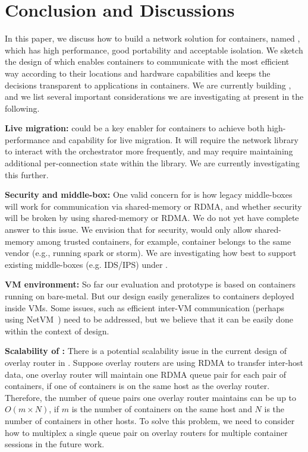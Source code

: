 \section{Conclusion and Discussions} \label{sec:discussion}

In this paper, we discuss how to build a network solution for containers, named \sysname, 
which has high performance, good portability and acceptable isolation. We sketch
the design of \sysname which enables containers to communicate with the most efficient
way according to their locations and hardware capabilities and keeps the decisions
transparent to applications in containers. We are currently building \sysname, and
we list several important considerations we are investigating at present in the following.

\textbf{Live migration:} 
\sysname could be a key enabler
for containers to achieve both high-performance and capability for live
migration. It will require the network library to interact with the orchestrator
more frequently, and may require maintaining additional per-connection state
within the library. We are currently investigating this further.

\textbf{Security and middle-box:} One valid concern for \sysname is how legacy
middle-boxes will work for communication via shared-memory or RDMA, and whether
security will be broken by using shared-memory or RDMA.  We do not yet have
complete answer to this issue. We envision that for security, \sysname would
only allow shared-memory among trusted containers, for example, container
belongs to the same vendor (e.g., running spark or storm).  We are investigating
how best to support existing middle-boxes (e.g. IDS/IPS) under \sysname.


\textbf{VM environment:}
So far our evaluation and prototype is based on containers running on
bare-metal.  But our design easily generalizes to containers deployed inside
VMs. Some issues, such as efficient inter-VM communication (perhaps using
NetVM~\cite{netvm}) need to be addressed, but we believe that it can be easily
done within the context of \sysname design.


\textbf{Scalability of \sysname :}
There is a potential scalability issue in the current design of overlay router in \sysname.
Suppose overlay routers are using RDMA to transfer inter-host data, one overlay router 
will maintain one RDMA queue pair for each pair of containers, if one of containers is on 
the same host as the overlay router. Therefore, the number of queue pairs one overlay router
maintains can be up to $O(m \times N)$, if $m$ is the number of containers on the same host
and $N$ is the number of containers in other hosts. To solve this problem, we need to consider
how to multiplex a single queue pair on overlay routers for multiple container sessions 
in the future work. 


